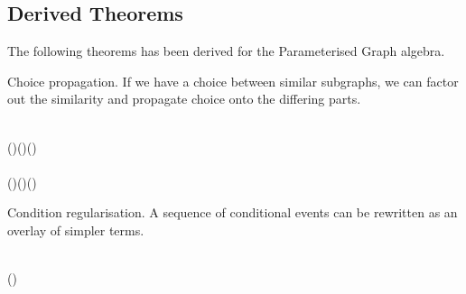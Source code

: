 \subsection{Derived Theorems}

The following theorems has been derived for the Parameterised Graph algebra.


Choice propagation. If we have a choice between similar subgraphs, we can factor out the similarity and propagate choice onto the differing parts.
\begin{hscode}\SaveRestoreHook
{}%
%
%
\>[B]{}\;\mathbin{:}\;\;\;\;\;\;\;{}\<[E]%
\\
\>[B]{}\<[5]%
\>[5]{}\D{[}\D{]}\;(\;\D{\seq}\;)\;\D{+}\;\D{[}\;\D{]}\;(\;\D{\seq}\;)\;\;\;\D{\seq}\;(\D{[}\D{]}\;\;\D{+}\;\D{[}\;\D{]}\;){}\<[E]%
\\
\>[B]{}\;\mathbin{:}\;\;\;\;\;\;\;{}\<[E]%
\\
\>[B]{}\<[5]%
\>[5]{}\D{[}\D{]}\;(\;\D{\seq}\;)\;\D{+}\;\D{[}\;\D{]}\;(\;\D{\seq}\;)\;\;(\D{[}\D{]}\;\;\D{+}\;\D{[}\;\D{]}\;)\;\D{\seq}\;\<[E]%
\ColumnHook
\end{hscode}\resethooks


Condition regularisation. A sequence of conditional events can be rewritten as an overlay of simpler terms.
\begin{hscode}\SaveRestoreHook
{}%
%
%
%
\>[3]{}\;\mathbin{:}\;\;\;\;\;\;\;{}\<[E]%
\\
\>[3]{}\<[5]%
\>[5]{}\D{[}\D{]}\;\;\D{\seq}\;\D{[}\D{]}\;\;\;\D{[}\D{]}\;\;\D{+}\;\D{[}\D{]}\;\;\D{+}\;\D{[}\;\;\D{]}\;(\;\D{\seq}\;){}\<[E]%
\ColumnHook
\end{hscode}\resethooks

